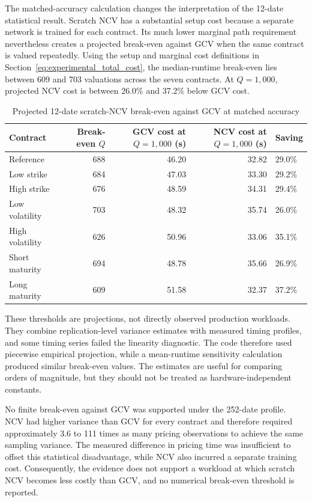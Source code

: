 The matched-accuracy calculation changes the interpretation of the 12-date statistical result. Scratch NCV has a substantial setup cost because a separate network is trained for each contract. Its much lower marginal path requirement nevertheless creates a projected break-even against GCV when the same contract is valued repeatedly. Using the setup and marginal cost definitions in Section~\ref{eq:experimental_total_cost}, the median-runtime break-even lies between 609 and 703 valuations across the seven contracts. At $Q = 1{,}000$, projected NCV cost is between 26.0\% and 37.2\% below GCV cost.

\begin{table}[htbp]
    \centering
    \caption{Projected 12-date scratch-NCV break-even against GCV at matched accuracy}
    \label{tab:break_even_12}
    \begin{tabular}{lrrrl}
        \hline
        Contract & Break-even $Q$ & GCV cost at $Q=1{,}000$ (s) & NCV cost at $Q=1{,}000$ (s) & Saving \\
        \hline
        Reference & 688 & 46.20 & 32.82 & 29.0\% \\
        Low strike & 684 & 47.03 & 33.30 & 29.2\% \\
        High strike & 676 & 48.59 & 34.31 & 29.4\% \\
        Low volatility & 703 & 48.32 & 35.74 & 26.0\% \\
        High volatility & 626 & 50.96 & 33.06 & 35.1\% \\
        Short maturity & 694 & 48.78 & 35.66 & 26.9\% \\
        Long maturity & 609 & 51.58 & 32.37 & 37.2\% \\
        \hline
    \end{tabular}
\end{table}

These thresholds are projections, not directly observed production workloads. They combine replication-level variance estimates with measured timing profiles, and some timing series failed the linearity diagnostic. The code therefore used piecewise empirical projection, while a mean-runtime sensitivity calculation produced similar break-even values. The estimates are useful for comparing orders of magnitude, but they should not be treated as hardware-independent constants.

No finite break-even against GCV was supported under the 252-date profile. NCV had higher variance than GCV for every contract and therefore required approximately 3.6 to 111 times as many pricing observations to achieve the same sampling variance. The measured difference in pricing time was insufficient to offset this statistical disadvantage, while NCV also incurred a separate training cost. Consequently, the evidence does not support a workload at which scratch NCV becomes less costly than GCV, and no numerical break-even threshold is reported.

